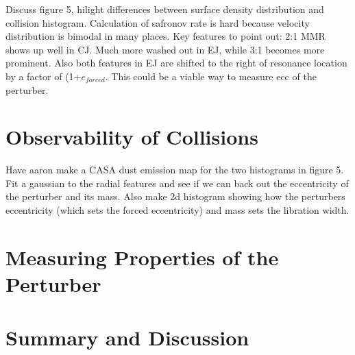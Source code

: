 \documentclass[onecolumn]{aastex63}
\begin{document}
Discuss figure 5, hilight differences between surface density distribution and collision histogram. Calculation of safronov rate is hard because velocity distribution is bimodal in many places. Key features to point out: 2:1 MMR shows up well in CJ. Much more washed out in EJ, while 3:1 becomes more prominent. Also both features in EJ are shifted to the right of resonance location by a factor of (1+$e_{forced}$. This could be a viable way to measure ecc of the perturber.

\section{Observability of Collisions} \label{sec:dust}

Have aaron make a CASA dust emission map for the two histograms in figure 5. Fit a gaussian to the radial features and see if we can back out the eccentricity of the perturber and its mass. Also make 2d histogram showing how the perturbers eccentricity (which sets the forced eccentricity) and mass sets the libration width.

\section{Measuring Properties of the Perturber} \label{sec:fitting}

\section{Summary and Discussion} \label{sec:discuss}



\clearpage
\end{document}
